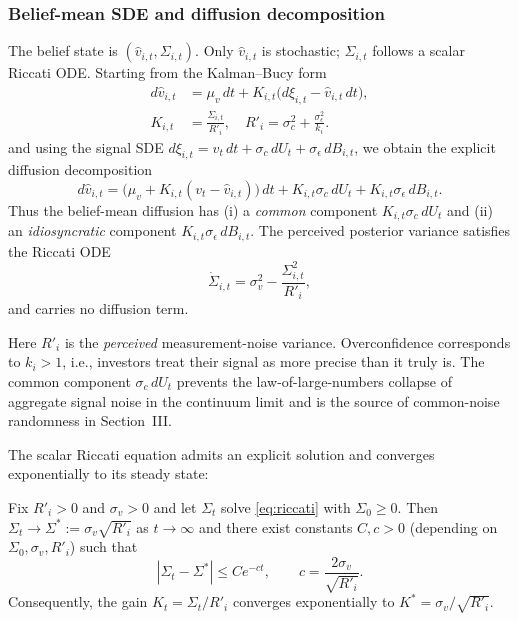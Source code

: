\subsubsection{Belief-mean SDE and diffusion decomposition}
The belief state is $(\hat v_{i,t},\Sigma_{i,t})$. Only $\hat v_{i,t}$ is stochastic; $\Sigma_{i,t}$ follows a scalar Riccati ODE.
Starting from the Kalman--Bucy form
\begin{equation}\label{eq:kalman_continuous}
\begin{split}
d\hat v_{i,t}&=\mu_v\,dt+K_{i,t}\bigl(d\xi_{i,t}-\hat v_{i,t}\,dt\bigr),\\
K_{i,t}&=\frac{\Sigma_{i,t}}{R'_i},\quad R'_i=\sigma_c^2+\frac{\sigma_\epsilon^2}{k_i}.
\end{split}
\end{equation}
and using the signal SDE $d\xi_{i,t}=v_t\,dt+\sigma_c\,dU_t+\sigma_\epsilon\,dB_{i,t}$, we obtain the explicit diffusion decomposition
\begin{equation}\label{eq:vhat_diffusion_decomp}
d\hat v_{i,t}
=\bigl(\mu_v+K_{i,t}(v_t-\hat v_{i,t})\bigr)\,dt
+K_{i,t}\sigma_c\,dU_t
+K_{i,t}\sigma_\epsilon\,dB_{i,t}.
\end{equation}
Thus the belief-mean diffusion has (i) a \emph{common} component $K_{i,t}\sigma_c\,dU_t$ and (ii) an \emph{idiosyncratic} component $K_{i,t}\sigma_\epsilon\,dB_{i,t}$.
The perceived posterior variance satisfies the Riccati ODE
\begin{equation}\label{eq:riccati}
\dot\Sigma_{i,t}=\sigma_v^2-\frac{\Sigma_{i,t}^2}{R'_i},
\end{equation}
and carries no diffusion term.

Here $R'_i$ is the \emph{perceived} measurement-noise variance. Overconfidence corresponds to $k_i>1$, i.e., investors treat their signal as more precise than it truly is. The common component $\sigma_c\,dU_t$ prevents the law-of-large-numbers collapse of aggregate signal noise in the continuum limit and is the source of common-noise randomness in Section~III.

The scalar Riccati equation admits an explicit solution and converges exponentially to its steady state:
\begin{lemma}
\label{lem:riccati_convergence}
Fix $R'_i>0$ and $\sigma_v>0$ and let $\Sigma_t$ solve \eqref{eq:riccati} with $\Sigma_0\ge 0$. Then $\Sigma_t\to \Sigma^*:=\sigma_v\sqrt{R'_i}$ as $t\to\infty$ and there exist constants $C,c>0$ (depending on $\Sigma_0,\sigma_v,R'_i$) such that
\begin{equation}
|\Sigma_t-\Sigma^*|\le C e^{-ct},\qquad c=\frac{2\sigma_v}{\sqrt{R'_i}}.
\end{equation}
Consequently, the gain $K_t=\Sigma_t/R'_i$ converges exponentially to $K^*=\sigma_v/\sqrt{R'_i}$.
\end{lemma}

